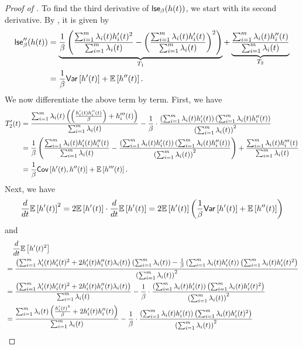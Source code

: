 \begin{proof}[Proof of ]
To find the third derivative of $\mathsf{lse}_{\beta}(h(t))$, we start with its second derivative. By , it is given by
\begin{align*}
    \mathsf{lse}_{\beta}''(h(t)) &= \underbrace{\frac{1}{\beta}\left(\frac{\sum_{i=1}^m \lambda_i(t)h_i'(t)^2}{\sum_{i=1}^m \lambda_i(t)} - \left(\frac{\sum_{i=1}^m \lambda_i(t)h_i'(t)}{\sum_{i=1}^m \lambda_i(t)}\right)^2\right)}_{T_1} + \underbrace{\frac{\sum_{i=1}^m \lambda_i(t)h_i''(t)}{\sum_{i=1}^m \lambda_i(t)}}_{T_2} \\
    &= \frac{1}{\beta}\mathsf{Var}\left[h'(t)\right]+\mathbb{E}\left[h''(t)\right].
\end{align*}
We now differentiate the above term by term. First, we have
\begin{align*}
    T_2'(t) &= \frac{\sum_{i=1}^m \lambda_i(t)\left(\left(\frac{h_i'(t)h_i''(t)}{\beta}\right)+h_i'''(t)\right)}{\sum_{i=1}^m \lambda_i(t)} - \frac{1}{\beta}\cdot\frac{\left(\sum_{i=1}^m \lambda_i(t)h_i'(t)\right)\left(\sum_{i=1}^m \lambda_i(t)h_i''(t)\right)}{\left(\sum_{i=1}^m \lambda_i(t)\right)^2} \\
    &= \frac{1}{\beta}\left(\frac{\sum_{i=1}^m \lambda_i(t)h_i'(t)h_i''(t)}{\sum_{i=1}^m \lambda_i(t)} - \frac{\left(\sum_{i=1}^m \lambda_i(t)h_i'(t)\right)\left(\sum_{i=1}^m \lambda_i(t)h_i''(t)\right)}{\left(\sum_{i=1}^m \lambda_i(t)\right)^2}\right) + \frac{\sum_{i=1}^m \lambda_i(t)h_i'''(t)}{\sum_{i=1}^m \lambda_i(t)} \\
    &= \frac{1}{\beta}\mathsf{Cov}\left[h'(t),h''(t)\right] + \mathbb{E}\left[h'''(t)\right].
\end{align*}
Next, we have
\begin{align*}
    \frac{d}{dt}\mathbb{E}\left[h'(t)\right]^2 = 2\mathbb{E}\left[h'(t)\right] \cdot \frac{d}{dt}\mathbb{E}\left[h'(t)\right] = 2\mathbb{E}\left[h'(t)\right]\left(\frac{1}{\beta}\mathsf{Var}\left[h'(t)\right] + \mathbb{E}\left[h''(t)\right]\right)
\end{align*}
and
\begin{align*}
    &\quad \frac{d}{dt}\exv{h'(t)^2}\\
    &= \frac{\inparen{\sum_{i=1}^m \lambda_i'(t)h_i'(t)^2 + 2h_i'(t)h_i''(t)\lambda_i(t)}\inparen{\sum_{i=1}^m \lambda_i(t)} - \frac{1}{\beta}\inparen{\sum_{i=1}^m \lambda_i(t)h_i'(t)}\inparen{\sum_{i=1}^m \lambda_i(t)h_i'(t)^2}}{\inparen{\sum_{i=1}^m \lambda_i(t)}^2} \\
    &= \frac{\inparen{\sum_{i=1}^m \lambda_i'(t)h_i'(t)^2 + 2h_i'(t)h_i''(t)\lambda_i(t)}}{\sum_{i=1}^m \lambda_i(t)} - \frac{1}{\beta}\cdot\frac{\inparen{\sum_{i=1}^m \lambda_i(t)h_i'(t)}\inparen{\sum_{i=1}^m \lambda_i(t)h_i'(t)^2}}{\inparen{\sum_{i=1}^m \lambda_i(t)}^2} \\
    &= \frac{\sum_{i=1}^m \lambda_i(t)\inparen{\frac{h_i'(t)^3}{\beta} + 2h_i'(t)h_i''(t)}}{\sum_{i=1}^m \lambda_i(t)} - \frac{1}{\beta}\cdot\frac{\inparen{\sum_{i=1}^m \lambda_i(t)h_i'(t)}\inparen{\sum_{i=1}^m \lambda_i(t)h_i'(t)^2}}{\inparen{\sum_{i=1}^m \lambda_i(t)}^2} \\

\end{align*}
\end{proof}
